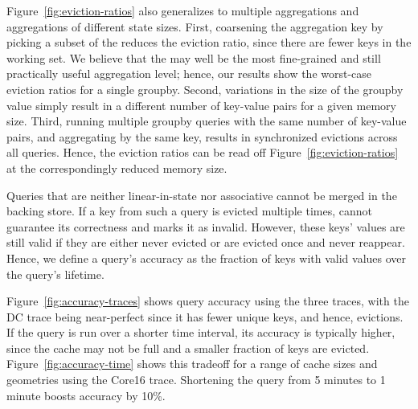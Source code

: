 Figure~\ref{fig:eviction-ratios} also generalizes to multiple aggregations and
aggregations of different state sizes. First, coarsening the aggregation key by
picking a subset of the \txtftuple reduces the eviction ratio, since there are
fewer keys in the working set. We believe that the \txtftuple may well be the
most fine-grained and still practically useful aggregation level; hence, our
results show the worst-case eviction ratios for a single {\ct groupby}.
Second, variations in the size of the {\ct groupby} value simply result in a
different number of key-value pairs for a given memory size. Third, running
multiple {\ct groupby} queries with the same number of key-value pairs, and
aggregating by the same key, results in synchronized evictions across all
queries. Hence, the eviction ratios can be read off
Figure~\ref{fig:eviction-ratios} at the correspondingly reduced memory size.

Queries that are neither linear-in-state nor associative cannot be merged in
the backing store. If a key from such a query is evicted multiple times,
\TheSystem cannot guarantee its correctness and marks it as invalid. However,
these keys' values are still valid if they are either never evicted or are
evicted once and never reappear. Hence, we define a query's accuracy as the
fraction of keys with valid values over the query's lifetime.

Figure~\ref{fig:accuracy-traces} shows query accuracy using the three traces,
with the DC trace being near-perfect since it has fewer unique keys, and hence,
evictions.  If the query is run over a shorter time interval, its accuracy is
typically higher, since the cache may not be full and a smaller fraction of
keys are evicted.  Figure~\ref{fig:accuracy-time} shows this tradeoff for a
range of cache sizes and geometries using the Core16 trace.  Shortening the
query from 5 minutes to 1 minute boosts accuracy by 10\%.

